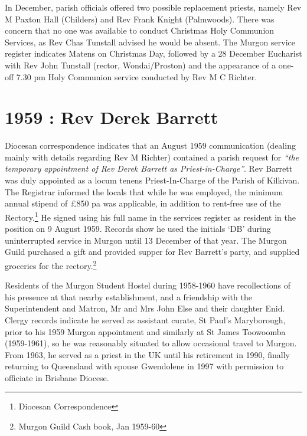 In December, parish officials offered two possible replacement priests, namely Rev M Paxton Hall (Childers) and Rev Frank Knight (Palmwoods). There was concern that no one was available to conduct Christmas Holy Communion Services, as Rev Chas Tunstall advised he would be absent. The Murgon service register indicates Matens on Christmas Day, followed by a 28 December Eucharist with Rev John Tunstall (rector, Wondai/Proston) and the appearance of a one-off 7.30 pm Holy Communion service conducted by Rev M C Richter.



\section{1959 : Rev Derek Barrett}



Diocesan correspondence indicates that an August 1959 communication (dealing mainly with details regarding Rev M Richter) contained a parish request for \emph{``the temporary appointment of Rev Derek Barrett as Priest-in-Charge''}. Rev Barrett was duly appointed as a locum tenens Priest-In-Charge of the Parish of Kilkivan. The Registrar informed the locals that while he was employed, the minimum annual stipend of \pounds850 pa was applicable, in addition to rent-free use of the Rectory.\footnote{Diocesan Correspondence} He signed using his full name in the services register as resident in the position on 9 August 1959. Records show he used the initials `DB' during uninterrupted service in Murgon until 13 December of that year. The Murgon Guild purchased a gift and provided supper for Rev Barrett's party, and supplied groceries for the rectory.\footnote{Murgon Guild Cash book, Jan 1959-60}


Residents of the Murgon Student Hostel during 1958-1960 have recollections of his presence at that nearby establishment, and a friendship with the Superintendent and Matron, Mr and Mrs John Else and their daughter Enid. Clergy records indicate he served as assistant curate, St Paul's Maryborough, prior to his 1959 Murgon appointment and similarly at St James Toowoomba (1959-1961), so he was reasonably situated to allow occasional travel to Murgon. From 1963, he served as a priest in the UK until his retirement in 1990, finally returning to Queensland with spouse Gwendolene in 1997 with permission to officiate in Brisbane Diocese.



